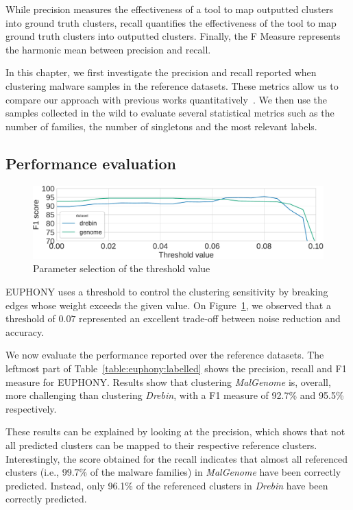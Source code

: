 While precision measures the effectiveness of a tool to map outputted clusters into ground truth clusters, recall quantifies the effectiveness of the tool to map ground truth clusters into outputted clusters.
Finally, the F Measure represents the harmonic mean between precision and recall.

In this chapter, we first investigate the precision and recall reported when clustering malware samples in the reference datasets.
These metrics allow us to compare our approach with previous works quantitatively~\cite{monrose_avclass:_2016}.
We then use the samples collected in the wild to evaluate several statistical metrics such as the number of families, the number of singletons and the most relevant labels.
\subsection{Performance evaluation}

\begin{figure}[!ht]
	\centering
	\includegraphics[width=\linewidth]{figures/euphony/threshold.pdf}
	\caption{Parameter selection of the threshold value}
	\label{figure:euphony:threshold}
\end{figure}

EUPHONY uses a threshold to control the clustering sensitivity by breaking edges whose weight exceeds the given value.
On Figure~\ref{figure:euphony:threshold}, we observed that a threshold of $0.07$ represented an excellent trade-off between noise reduction and accuracy.

We now evaluate the performance reported over the reference datasets.
The leftmost part of Table~\ref{table:euphony:labelled} shows the precision, recall and F1 measure for EUPHONY.
Results show that clustering {\em MalGenome} is, overall, more challenging than clustering {\em Drebin}, with a F1 measure of 92.7\% and 95.5\% respectively.

These results can be explained by looking at the precision, which shows that not all predicted clusters can be mapped to their respective reference clusters.
Interestingly, the score obtained for the recall indicates that almost all referenced clusters (i.e., 99.7\% of the malware families) in {\em MalGenome} have been correctly predicted.
Instead, only 96.1\% of the referenced clusters in {\em Drebin} have been correctly predicted.

